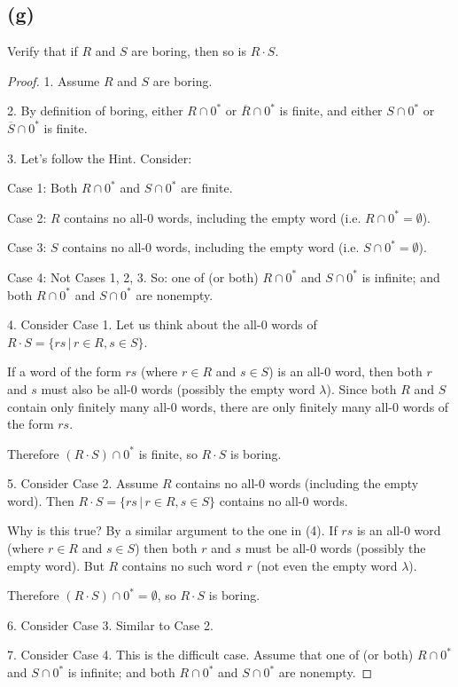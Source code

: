 \documentclass[14pt]{extarticle}
\begin{document}
\subsection{(g)}
Verify that if $R$ and $S$ are boring, then so is $R \cdot S$.
\begin{proof}
1. Assume $R$ and $S$ are boring.

2. By definition of boring, either $R \cap 0^*$ or $\overline{R} \cap 0^*$ is finite, and either $S \cap 0^*$ or $\overline{S} \cap 0^*$ is finite.

3. Let's follow the Hint. Consider:

Case 1: Both $R \cap 0^*$ and $S \cap 0^*$ are finite.

Case 2: $R$ contains no all-0 words, including the empty word (i.e. $R \cap 0^* = \emptyset$).

Case 3: $S$ contains no all-0 words, including the empty word (i.e. $S \cap 0^* = \emptyset$).

Case 4: Not Cases 1, 2, 3. So: one of (or both) $R \cap 0^*$ and $S \cap 0^*$ is infinite; and both $R \cap 0^*$ and $S \cap 0^*$ are nonempty. 

4. Consider Case 1. Let us think about the all-0 words of $R \cdot S = \{rs \, | \, r \in R, s \in S\}$. 

If a word of the form $rs$ (where $r \in R$ and $s \in S$) is an all-0 word, then both $r$ and $s$ must also be all-0 words (possibly the empty word $\lambda$). Since both $R$ and $S$ contain only finitely many all-0 words, there are only finitely many all-0 words of the form $rs$.

Therefore $(R \cdot S) \cap 0^*$ is finite, so $R \cdot S$ is boring.

5. Consider Case 2. Assume $R$ contains no all-0 words (including the empty word). Then $R \cdot S = \{rs \, | \, r \in R, s \in S\}$ contains no all-0 words. 

Why is this true? By a similar argument to the one in (4). If $rs$ is an all-0 word (where $r \in R$ and $s \in S$) then both $r$ and $s$ must be all-0 words (possibly the empty word). But $R$ contains no such word $r$ (not even the empty word $\lambda$).

Therefore $(R \cdot S) \cap 0^* = \emptyset$, so $R \cdot S$ is boring.

6. Consider Case 3. Similar to Case 2.

7. Consider Case 4. This is the difficult case. Assume that one of (or both) $R \cap 0^*$ and $S \cap 0^*$ is infinite; and both $R \cap 0^*$ and $S \cap 0^*$ are nonempty.


\end{proof}
\end{document}
